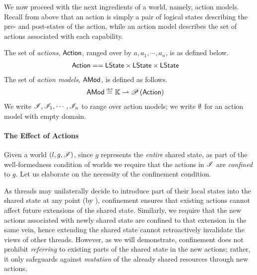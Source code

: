 We now proceed with the next ingredients of a \colosl world, namely, action models. Recall from above that an action is simply a pair of logical states describing the pre- and post-states of the action, while an action model describes the set of actions associated with each capability.
%
%
\begin{definition}
The set of \emph{actions}, $\mathsf{Action}$, ranged over by $a, a_1, \cdots, a_n$, is as defined below.
%
\begin{align*}
  \set{Action} &== \LStates \times \LStates \times \LStates
  \vspace{-1ex}
\end{align*}
%
The set of \emph{action models}, $\textsf{AMod}$, is defined as follows. 
%
\begin{align*}
	\textsf{AMod} &\mathrel{\stackrel{\smash{\scriptscriptstyle{\mathrm{def}}}}{=}} \mathbb{K} \rightharpoonup \mathscr{P}\left(\mathsf{Action} \right)
\end{align*}
%  
We write $\mathscr{I}, \mathscr{I}_1, \cdots, \mathscr{I}_n$ to range over action models; we write $\emptyset$ for an action model with empty domain.
\end{definition}
%
%
\paragraph{The Effect of Actions} 
Given a world $(l, g, \mathscr{I})$, since $g$ represents the \emph{entire} shared state, as part of the well-formedness condition of worlds we require that the actions in $\mathscr{I}$ are \emph{confined} to $g$.  
Let us elaborate on the necessity of the confinement condition.

As threads may unilaterally decide to introduce part of their local states into the shared state at any point (by \extendRule), confinement ensures that existing actions cannot affect future extensions of the shared state. Similarly, we require that the new actions associated with newly shared state are confined to that extension in the same vein, hence extending the shared state cannot retroactively invalidate the views of other threads. However, as we will demonstrate, confinement does not prohibit \emph{referring} to existing parts of the shared state in the new actions; rather, it only safeguards against \emph{mutation} of the already shared resources through new actions.

